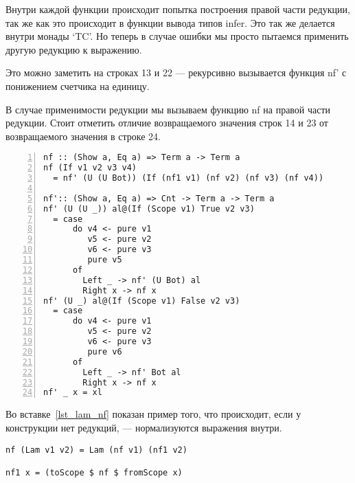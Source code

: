 Внутри каждой функции происходит попытка построения правой части редукции, так же как это происходит в функции вывода типов infer. Это так же делается внутри монады `TC'. Но теперь в случае ошибки мы просто пытаемся применить другую редукцию к выражению.

Это можно заметить на строках 13 и 22 --- рекурсивно вызывается функция nf' с понижением счетчика на единицу.

В случае применимости редукции мы вызываем функцию nf на правой части редукции. Стоит отметить отличие возвращаемого значения строк 14 и 23 от возвращаемого значения в строке 24.

\begin{lstlisting}[caption={Приведение в нормальную форму пытается применить все редукции данного функционального символа},captionpos=b, frame=single, float, floatplacement=H, label={lst_if_nf}, numbers=left]
nf :: (Show a, Eq a) => Term a -> Term a
nf (If v1 v2 v3 v4)
  = nf' (U (U Bot)) (If (nf1 v1) (nf v2) (nf v3) (nf v4))

nf':: (Show a, Eq a) => Cnt -> Term a -> Term a
nf' (U (U _)) al@(If (Scope v1) True v2 v3)
  = case
      do v4 <- pure v1
         v5 <- pure v2
         v6 <- pure v3
         pure v5
      of
        Left _ -> nf' (U Bot) al
        Right x -> nf x
nf' (U _) al@(If (Scope v1) False v2 v3)
  = case
      do v4 <- pure v1
         v5 <- pure v2
         v6 <- pure v3
         pure v6
      of
        Left _ -> nf' Bot al
        Right x -> nf x
nf' _ x = xl
\end{lstlisting}

Во вставке~\ref{lst_lam_nf} показан пример того, что происходит, если  у конструкции нет редукций, --- нормализуются выражения внутри.

\begin{lstlisting}[caption={Приведение в нормальную форму конструкции, у которой нет редукций}, captionpos=b, frame=single, float, floatplacement=H, label={lst_lam_nf}]
nf (Lam v1 v2) = Lam (nf v1) (nf1 v2)

nf1 x = (toScope $ nf $ fromScope x)
\end{lstlisting}
